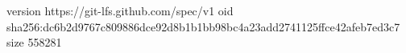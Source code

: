 version https://git-lfs.github.com/spec/v1
oid sha256:dc6b2d9767c809886dce92d8b1b1bb98bc4a23add2741125ffce42afeb7ed3c7
size 558281
